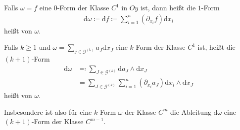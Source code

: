 \begin{theorem}[Differentiation] \label{thm:8.3}
  \begin{enum-arab}
  \item
    Falls $\omega = f$ eine $0$-Form der Klasse $C^1$ in $Oy$ ist, dann heißt die $1$-Form
    \begin{align*}
      \mathrm d \omega \coloneq \mathrm df \coloneq \sum_{i=1}^n (\partial_{x_i} f) \mathrm d x_i
    \end{align*}
    heißt  von $\omega$.
  \item
    Falls $k \ge 1$ und $\omega = \sum_{j \in \mathcal{G}^{(k)}} a_J \mathrm d x_J$ eine $k$-Form der Klasse $C^1$ ist, heißt die $(k+1)$-Form
    \begin{align*}
      \mathrm d \omega &\eqcolon \sum_{J \in \mathcal{G}^{(k)}} \mathrm d a_J \wedge \mathrm d x_J \\
      &= \sum_{J \in \mathcal{G}^{(k)}} \sum_{i=1}^n (\partial_{x_i} a_J) \mathrm{d} x_i \wedge \mathrm d x_J
    \end{align*}
    heißt  von $\omega$.
  \end{enum-arab}
  Insbesondere ist also für eine $k$-Form $\omega$ der Klasse $C^m$ die Ableitung $\mathrm d \omega$ eine $(k+1)$-Form der Klasse $C^{m-1}$.
\end{theorem}

